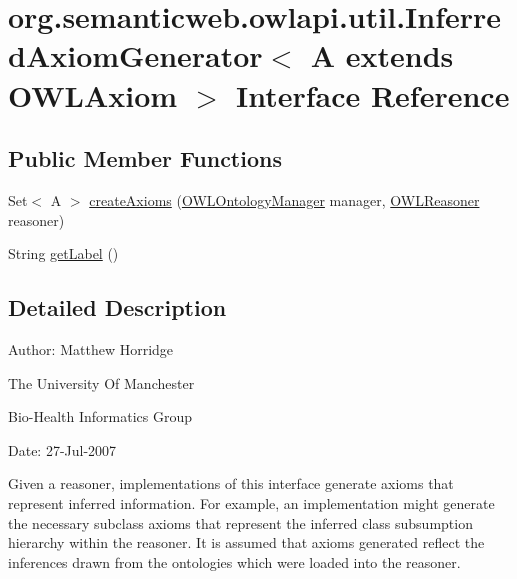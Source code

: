\hypertarget{interfaceorg_1_1semanticweb_1_1owlapi_1_1util_1_1_inferred_axiom_generator_3_01_a_01extends_01_o_w_l_axiom_01_4}{\section{org.\-semanticweb.\-owlapi.\-util.\-Inferred\-Axiom\-Generator$<$ A extends O\-W\-L\-Axiom $>$ Interface Reference}
\label{interfaceorg_1_1semanticweb_1_1owlapi_1_1util_1_1_inferred_axiom_generator_3_01_a_01extends_01_o_w_l_axiom_01_4}
}
\subsection*{Public Member Functions}
\begin{DoxyCompactItemize}
\item 
Set$<$ A $>$ \hyperlink{interfaceorg_1_1semanticweb_1_1owlapi_1_1util_1_1_inferred_axiom_generator_3_01_a_01extends_01_o_w_l_axiom_01_4_a4576f200a51028d3a8b0a371e4ca8a3e}{create\-Axioms} (\hyperlink{interfaceorg_1_1semanticweb_1_1owlapi_1_1model_1_1_o_w_l_ontology_manager}{O\-W\-L\-Ontology\-Manager} manager, \hyperlink{interfaceorg_1_1semanticweb_1_1owlapi_1_1reasoner_1_1_o_w_l_reasoner}{O\-W\-L\-Reasoner} reasoner)
\item 
String \hyperlink{interfaceorg_1_1semanticweb_1_1owlapi_1_1util_1_1_inferred_axiom_generator_3_01_a_01extends_01_o_w_l_axiom_01_4_a43cc81d7437cc0727362207be022116b}{get\-Label} ()
\end{DoxyCompactItemize}


\subsection{Detailed Description}
Author\-: Matthew Horridge\par
 The University Of Manchester\par
 Bio-\/\-Health Informatics Group\par
 Date\-: 27-\/\-Jul-\/2007\par
\par


Given a reasoner, implementations of this interface generate axioms that represent inferred information. For example, an implementation might generate the necessary subclass axioms that represent the inferred class subsumption hierarchy within the reasoner. It is assumed that axioms generated reflect the inferences drawn from the ontologies which were loaded into the reasoner.


